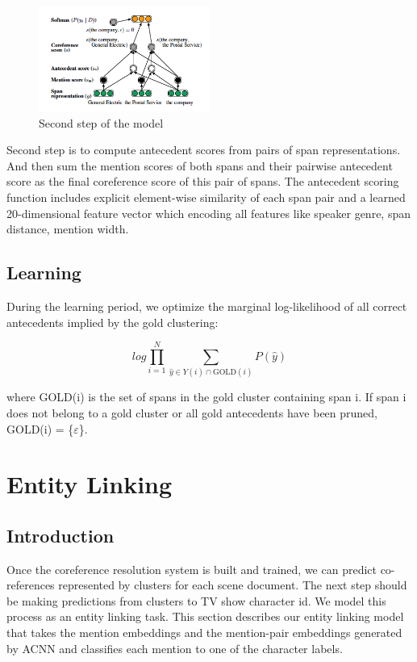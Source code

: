 \documentclass[11pt]{article}
\begin{document}
\begin{figure}[h]                
 \includegraphics[width=0.5\textwidth]{03.jpg}
 \caption{Second step of the model}             
\end{figure}

Second step is to compute antecedent scores from pairs of span representations. And then sum the mention scores of both spans and their pairwise antecedent score as the final coreference score of this pair of spans.
The antecedent scoring function includes explicit element-wise similarity of each span pair and a learned 20-dimensional feature vector which encoding all features like speaker genre, span distance, mention width.

\subsection{Learning}
During the learning period, we optimize the marginal log-likelihood of all correct antecedents implied by the gold clustering:

\begin{equation}
log\prod^{N}_{i=1}\sum_{\widehat{y}\in Y(i)\cap \text{GOLD}(i)}P(\widehat{y})
\end{equation}


where GOLD(i) is the set of spans in the gold cluster containing span i. If span i does not belong to a gold cluster or all gold antecedents have been pruned, GOLD(i) = \{$\varepsilon $\}.


\section{Entity Linking}

\subsection{Introduction}
Once the coreference resolution system is built and trained, we can predict co-references represented by clusters for each scene document. The next step should be making predictions from clusters to TV show character id. We model this process as an entity linking task. This section describes our entity linking model that takes the mention embeddings and the mention-pair embeddings generated by ACNN and classifies each mention to one of the character labels.
\end{document}
